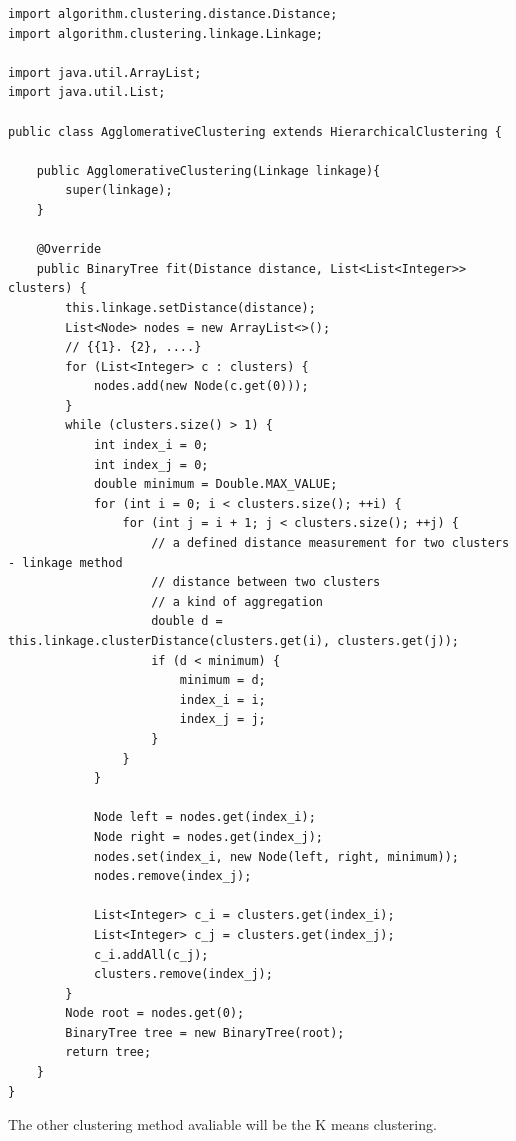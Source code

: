 \documentclass[]{final_report}
\begin{document}
\begin{verbatim}
import algorithm.clustering.distance.Distance;
import algorithm.clustering.linkage.Linkage;

import java.util.ArrayList;
import java.util.List;

public class AgglomerativeClustering extends HierarchicalClustering {

    public AgglomerativeClustering(Linkage linkage){
        super(linkage);
    }

    @Override
    public BinaryTree fit(Distance distance, List<List<Integer>> clusters) {
        this.linkage.setDistance(distance);
        List<Node> nodes = new ArrayList<>();
        // {{1}. {2}, ....}
        for (List<Integer> c : clusters) {
            nodes.add(new Node(c.get(0)));
        }
        while (clusters.size() > 1) {
            int index_i = 0;
            int index_j = 0;
            double minimum = Double.MAX_VALUE;
            for (int i = 0; i < clusters.size(); ++i) {
                for (int j = i + 1; j < clusters.size(); ++j) {
                    // a defined distance measurement for two clusters - linkage method
                    // distance between two clusters
                    // a kind of aggregation
                    double d = this.linkage.clusterDistance(clusters.get(i), clusters.get(j));
                    if (d < minimum) {
                        minimum = d;
                        index_i = i;
                        index_j = j;
                    }
                }
            }

            Node left = nodes.get(index_i);
            Node right = nodes.get(index_j);
            nodes.set(index_i, new Node(left, right, minimum));
            nodes.remove(index_j);

            List<Integer> c_i = clusters.get(index_i);
            List<Integer> c_j = clusters.get(index_j);
            c_i.addAll(c_j);
            clusters.remove(index_j);
        }
        Node root = nodes.get(0);
        BinaryTree tree = new BinaryTree(root);
        return tree;
    }
}
\end{verbatim}

The other clustering method avaliable will be the K means clustering.
\end{document}
